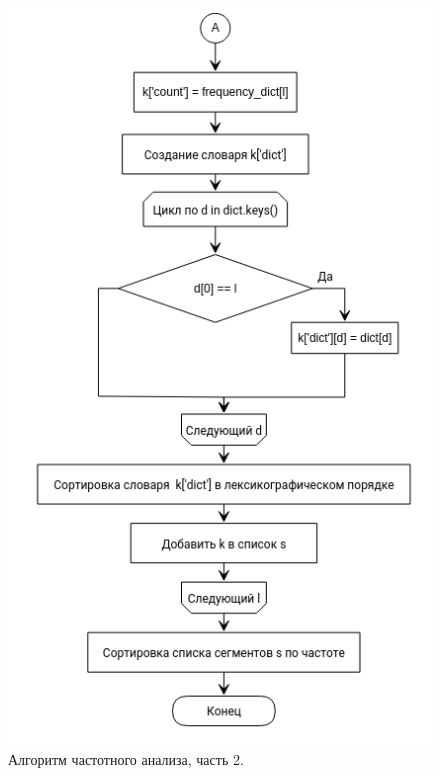 \documentclass[12pt]{report}
\begin{document}
\begin{figure}[h]
	\begin{center}
		\includegraphics[scale=0.8]{freq2.png}
		\caption{Алгоритм частотного анализа, часть 2.}
		\label{fig:freq2}
	\end{center}
\end{figure}
\end{document}
